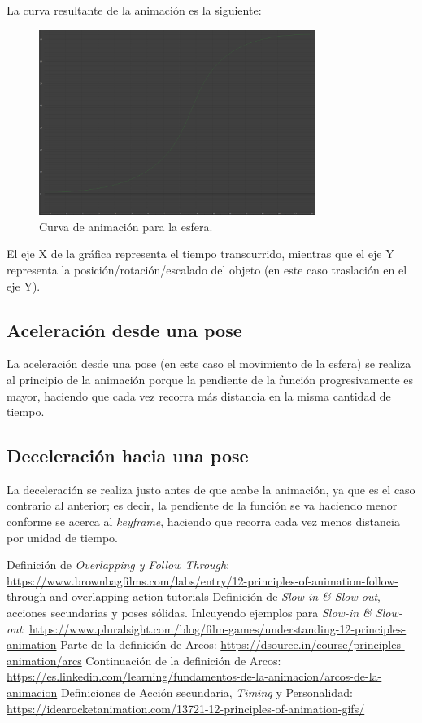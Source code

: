\documentclass{article}
\begin{document}
\bigskip

La curva resultante de la animación es la siguiente:

\begin{figure}[H]
    \centering
    \includegraphics[width=0.8\textwidth]{imagenes/curva.png}
    \caption{Curva de animación para la esfera.}
\end{figure}

El eje X de la gráfica representa el tiempo transcurrido, mientras que el eje Y representa la posición/rotación/escalado del objeto (en este caso traslación en el eje Y).

\subsection{Aceleración desde una pose}
La aceleración desde una pose (en este caso el movimiento de la esfera) se realiza al principio de la animación porque la pendiente de la función progresivamente es mayor, haciendo que cada vez recorra más distancia en la misma cantidad de tiempo.
\subsection{Deceleración hacia una pose}

La deceleración se realiza justo antes de que acabe la animación, ya que es el caso contrario al anterior; es decir, la pendiente de la función se va haciendo menor conforme se acerca al \textit{keyframe}, haciendo que recorra cada vez menos distancia por unidad de tiempo.

\newpage

\begin{thebibliography}{1}
     Definición de \textit{Overlapping y Follow Through}: \url{https://www.brownbagfilms.com/labs/entry/12-principles-of-animation-follow-through-and-overlapping-action-tutorials} 
     Definición de \textit{Slow-in \& Slow-out}, acciones secundarias y poses sólidas. Inlcuyendo ejemplos para \textit{Slow-in \& Slow-out}: \url{https://www.pluralsight.com/blog/film-games/understanding-12-principles-animation}
     Parte de la definición de Arcos: \url{https://dsource.in/course/principles-animation/arcs}
     Continuación de la definición de Arcos: \url{https://es.linkedin.com/learning/fundamentos-de-la-animacion/arcos-de-la-animacion}
     Definiciones de Acción secundaria, \textit{Timing} y Personalidad: \url{https://idearocketanimation.com/13721-12-principles-of-animation-gifs/}
\end{thebibliography}
\end{document}
